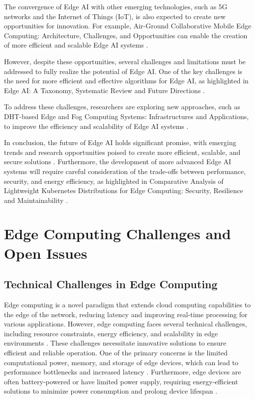\documentclass[11pt,a4paper]{article}
\begin{document}
The convergence of Edge AI with other emerging technologies, such as 5G networks and the Internet of Things (IoT), is also expected to create new opportunities for innovation. For example, Air-Ground Collaborative Mobile Edge Computing: Architecture, Challenges, and Opportunities can enable the creation of more efficient and scalable Edge AI systems \cite{arxiv:2101.07930}.

However, despite these opportunities, several challenges and limitations must be addressed to fully realize the potential of Edge AI. One of the key challenges is the need for more efficient and effective algorithms for Edge AI, as highlighted in Edge AI: A Taxonomy, Systematic Review and Future Directions \cite{arxiv:2407.04053}. 

To address these challenges, researchers are exploring new approaches, such as DHT-based Edge and Fog Computing Systems: Infrastructures and Applications, to improve the efficiency and scalability of Edge AI systems \cite{arxiv:2211.05851}. 

In conclusion, the future of Edge AI holds significant promise, with emerging trends and research opportunities poised to create more efficient, scalable, and secure solutions \cite{arxiv:2402.13056}. Furthermore, the development of more advanced Edge AI systems will require careful consideration of the trade-offs between performance, security, and energy efficiency, as highlighted in Comparative Analysis of Lightweight Kubernetes Distributions for Edge Computing: Security, Resilience and Maintainability \cite{arxiv:2503.04815}.


\section{Edge Computing Challenges and Open Issues}



\subsection{Technical Challenges in Edge Computing}


Edge computing is a novel paradigm that extends cloud computing capabilities to the edge of the network, reducing latency and improving real-time processing for various applications. However, edge computing faces several technical challenges, including resource constraints, energy efficiency, and scalability in edge environments \cite{arxiv:1702.05309}. These challenges necessitate innovative solutions to ensure efficient and reliable operation. One of the primary concerns is the limited computational power, memory, and storage of edge devices, which can lead to performance bottlenecks and increased latency \cite{arxiv:1611.05539}. Furthermore, edge devices are often battery-powered or have limited power supply, requiring energy-efficient solutions to minimize power consumption and prolong device lifespan \cite{arxiv:2402.13056}.
\end{document}
